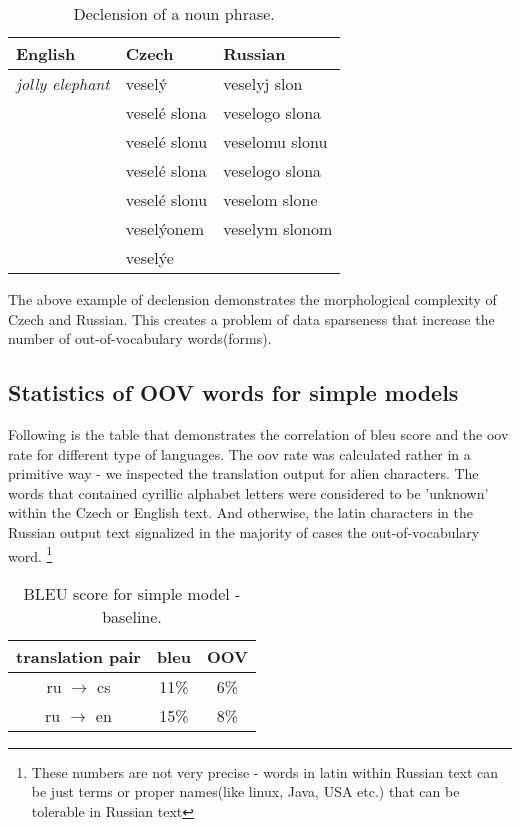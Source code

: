 \documentclass[11pt,letterpaper]{article}
\begin{document}
\begin{table}
\begin{center}
\begin{tabular}{|l|l|l|}
\hline
English & Czech & Russian \\ \hline
\textit{jolly elephant} & veselý & veselyj slon \\
 & veselé slona & veselogo slona \\
 & veselé slonu & veselomu slonu \\
 & veselé slona & veselogo slona \\ 
 & veselé slonu & veselom slone\\
 & veselýonem& veselym slonom\\
 & veselýe &\\
\hline
\end{tabular}
\end{center}
\caption{Declension of a noun phrase.}
\label{tab:slon}
\end{table}

The above example of declension demonstrates the morphological complexity of Czech and Russian.
This creates a problem of data sparseness that increase the number of out-of-vocabulary words(forms).

\subsection{Statistics of OOV words for simple models} 

Following is the table that demonstrates the correlation of bleu score and 
the oov rate for different type of languages. 
The oov rate was calculated 
rather in a primitive way - we inspected the translation output for alien characters. The words that contained
cyrillic alphabet letters were considered to be 'unknown' within the Czech or English text.
And otherwise, the latin characters in the Russian output text signalized in the majority of cases 
the out-of-vocabulary word. \footnote{These numbers are not very precise - words in latin within Russian text
can be just terms or proper names(like linux, Java, USA etc.) that can be tolerable in Russian text }

 
\begin{table*}
\begin{center}
\begin{tabular}{c c c}
\hline
translation pair& bleu & OOV \\
\hline
ru $\rightarrow$ cs & 11\% & 6\% \\%
ru $\rightarrow$  en & 15\% & 8\% \\ %
\hline
\end{tabular}
\end{center}
\caption{BLEU score for simple model - baseline.}
\label{tab:umc_yan}
\end{table*}
\end{document}
